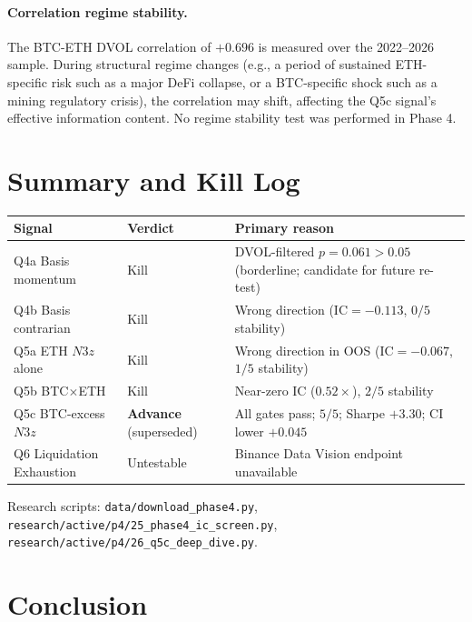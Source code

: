 \documentclass[12pt, a4paper]{article}
\theoremstyle{plain}
\theoremstyle{definition}
\newcommand{\IC}{\mathrm{IC}}
\begin{document}
\paragraph{Correlation regime stability.}
The BTC-ETH DVOL correlation of $+0.696$ is measured over the 2022--2026
sample.  During structural regime changes (e.g., a period of sustained
ETH-specific risk such as a major DeFi collapse, or a BTC-specific shock
such as a mining regulatory crisis), the correlation may shift, affecting
the Q5c signal's effective information content.  No regime stability test
was performed in Phase 4.

\section{Summary and Kill Log}
\label{sec:summary}

\begin{center}
\begin{tabular}{lll}
\toprule
Signal & Verdict & Primary reason \\
\midrule
Q4a Basis momentum   & Kill & DVOL-filtered $p = 0.061 > 0.05$ (borderline; candidate for future re-test) \\
Q4b Basis contrarian & Kill & Wrong direction ($\IC = -0.113$, $0/5$ stability) \\
Q5a ETH $N3z$ alone  & Kill & Wrong direction in OOS ($\IC = -0.067$, $1/5$ stability) \\
Q5b BTC$\times$ETH   & Kill & Near-zero IC ($0.52\times$), $2/5$ stability \\
Q5c BTC-excess $N3z$ & \textbf{Advance} (superseded) & All gates pass; $5/5$; Sharpe $+3.30$; CI lower $+0.045$ \\
Q6 Liquidation Exhaustion & Untestable & Binance Data Vision endpoint unavailable \\
\bottomrule
\end{tabular}
\end{center}

Research scripts: \texttt{data/download\_phase4.py},
\texttt{research/active/p4/25\_phase4\_ic\_screen.py},
\texttt{research/active/p4/26\_q5c\_deep\_dive.py}.

\section{Conclusion}
\label{sec:conclusion}
\end{document}

